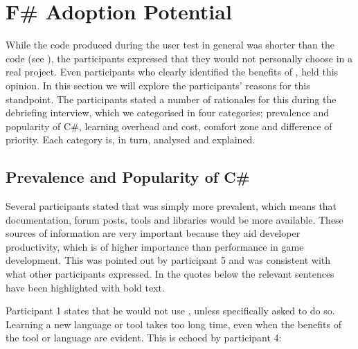 \section{F\# Adoption Potential}\label{sec:adoption}\label{sec:test-conc}
While the \fs code produced during the user test in general was shorter than the \cs code (see ), the participants expressed that they would not personally choose \fs in a real project. Even participants who clearly identified the benefits of \fs, held this opinion. In this section we will explore the participants' reasons for this standpoint. The participants stated a number of rationales for this during the debriefing interview, which we categorised in four categories; prevalence and popularity of C\#, learning overhead and cost, comfort zone and difference of priority. Each category is, in turn, analysed and explained.

\subsection{Prevalence and Popularity of C\#}
Several participants stated that \cs was simply more prevalent, which means that documentation, forum posts, tools and libraries would be more available. These sources of information are very important because they aid developer productivity, which is of higher importance than performance in game development. This was pointed out by participant 5 and was consistent with what other participants expressed. In the quotes below the relevant sentences have been highlighted with bold text.


Participant 1 states that he would not use \fs, unless specifically asked to do so. Learning a new language or tool takes too long time, even when the benefits of the tool or language are evident. This is echoed by participant 4:



